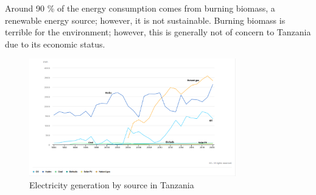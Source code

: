 


Around 90 \% of the energy consumption comes from burning biomass, a renewable energy source; however, it is not sustainable. Burning biomass is terrible for the environment; however, this is generally not of concern to Tanzania due to its economic status. 



    \begin{figure}
        \includegraphics[width=0.8\textwidth]{IMG/Screenshot from 2023-03-15 12-36-31.png}
        \caption{Electricity generation by source in Tanzania \cite{iea}}
        \end{figure}\label{fig:4_Review_1}
    
